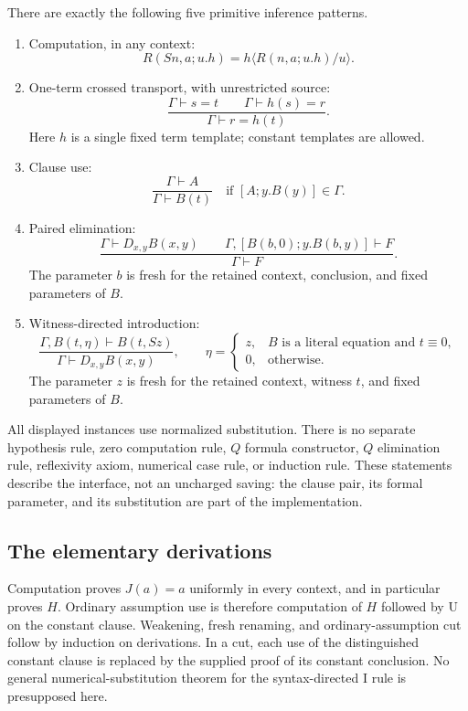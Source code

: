There are exactly the following five primitive inference patterns.
\begin{enumerate}
\item Computation, in any context:
\[
 R(Sn,a;u.h)=h\langle R(n,a;u.h)/u\rangle.
 \tag{R}
\]
\item One-term crossed transport, with unrestricted source:
\[
 \frac{\Gamma\vdash s=t\qquad\Gamma\vdash h(s)=r}
      {\Gamma\vdash r=h(t)}.
 \tag{T}
\]
Here $h$ is a single fixed term template; constant templates are allowed.
\item Clause use:
\[
 \frac{\Gamma\vdash A}{\Gamma\vdash B(t)}
 \quad\text{if }[A;y.B(y)]\in\Gamma.
 \tag{U}
\]
\item Paired elimination:
\[
 \frac{\Gamma\vdash D_{x,y}B(x,y)\qquad
       \Gamma,[B(b,0);y.B(b,y)]\vdash F}
      {\Gamma\vdash F}.
 \tag{E}
\]
The parameter $b$ is fresh for the retained context, conclusion, and
fixed parameters of $B$.
\item Witness-directed introduction:
\[
 \frac{\Gamma,B(t,\eta)\vdash B(t,Sz)}
      {\Gamma\vdash D_{x,y}B(x,y)},\qquad
 \eta=\begin{cases}
 z,&B\text{ is a literal equation and }t\equiv0,\\
 0,&\text{otherwise}.
 \end{cases}
 \tag{I}
\]
The parameter $z$ is fresh for the retained context, witness $t$, and
fixed parameters of $B$.
\end{enumerate}
All displayed instances use normalized substitution. There is no separate
hypothesis rule, zero computation rule, $Q$ formula constructor, $Q$
elimination rule, reflexivity axiom, numerical case rule, or induction
rule. These statements describe the interface, not an uncharged saving:
the clause pair, its formal parameter, and its substitution are part of
the implementation.

\subsection{The elementary derivations}

Computation proves $J(a)=a$ uniformly in every context, and in particular
proves $H$. Ordinary assumption use is therefore computation of $H$
followed by U on the constant clause. Weakening, fresh renaming, and
ordinary-assumption cut follow by induction on derivations. In a cut,
each use of the distinguished constant clause is replaced by the supplied
proof of its constant conclusion. No general numerical-substitution
theorem for the syntax-directed I rule is presupposed here.


